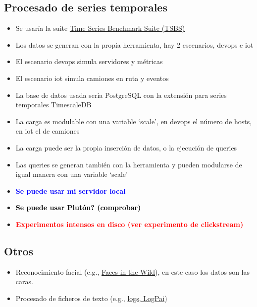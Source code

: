 \documentclass[preprint,3p]{elsarticle}
\begin{document}
\subsection{Procesado de series temporales}

\begin{itemize}
	\item Se usaría la suite \href{https://github.com/timescale/tsbs}{Time Series Benchmark Suite (TSBS)}
	\item Los datos se generan con la propia herramienta, hay 2 escenarios, devops e iot
	\item El escenario devops simula servidores y métricas
	\item El escenario iot simula camiones en ruta y eventos
	\item La base de datos usada seria PostgreSQL con la extensión para series temporales TimescaleDB
	\item La carga es modulable con una variable `scale', en devops el número de hosts, en iot el de camiones
	\item La carga puede ser la propia inserción de datos, o la ejecución de queries
	\item Las queries se generan también con la herramienta y pueden modularse de igual manera con una variable `scale'
	\item \textcolor{blue}{\textbf{Se puede usar mi servidor local}}
	\item \textcolor{black}{\textbf{Se puede usar Plutón? (comprobar)}}
	\item \textcolor{red}{\textbf{Experimentos intensos en disco (ver experimento de clickstream)}}
\end{itemize}


\subsection{Otros}
\begin{itemize}
		
	\item Reconocimiento facial (e.g., \href{http://vis-www.cs.umass.edu/lfw/}{Faces in the Wild}), en este caso los datos son las caras.
		
	\item Procesado de ficheros de texto (e.g., \href{https://github.com/logpai}{logs, LogPai})
	
\end{itemize}
\end{document}
